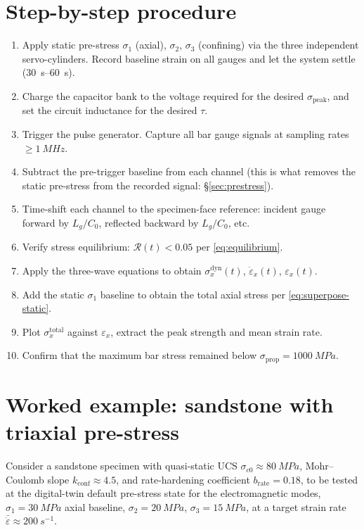 \documentclass[11pt,a4paper,openany]{book}
\providecommand{\SI}[2]{\qty{#1}{#2}}
\providecommand{\SIrange}[3]{\qtyrange{#1}{#2}{#3}}
\theoremstyle{handbook}
\newcommand{\sig}{\sigma}
\newcommand{\eps}{\varepsilon}
\newcommand{\epsdot}{\dot\eps}
\newcommand{\Cz}{C_0}
\newcommand{\sigprop}{\sig_{\text{prop}}}
\newcommand{\sigpeak}{\sig_{\text{peak}}}
\begin{document}
\section{Step-by-step procedure}

\begin{stepbox}
\begin{enumerate}[leftmargin=*,itemsep=3pt]
  \item Apply static pre-stress $\sig_1$ (axial), $\sig_2$, $\sig_3$
        (confining) via the three independent servo-cylinders. Record
        baseline strain on all gauges and let the system settle
        (\SIrange{30}{60}{s}).
  \item Charge the capacitor bank to the voltage required for the desired
        $\sigpeak$, and set the circuit inductance for the desired $\tau$.
  \item Trigger the pulse generator. Capture all bar gauge signals at
        sampling rates $\ge\SI{1}{MHz}$.
  \item Subtract the pre-trigger baseline from each channel (this is what
        removes the static pre-stress from the recorded signal:
        \S\ref{sec:prestress}).
  \item Time-shift each channel to the specimen-face reference: incident
        gauge forward by $L_g/\Cz$, reflected backward by $L_g/\Cz$, etc.
  \item Verify stress equilibrium: $\mathcal{R}(t)<0.05$ per
        \eqref{eq:equilibrium}.
  \item Apply the three-wave equations to obtain $\sig_x^{\text{dyn}}(t)$,
        $\epsdot_x(t)$, $\eps_x(t)$.
  \item Add the static $\sig_1$ baseline to obtain the total axial stress
        per \eqref{eq:superpose-static}.
  \item Plot $\sig_x^{\text{total}}$ against $\eps_x$, extract the peak
        strength and mean strain rate.
  \item Confirm that the maximum bar stress remained below
        $\sigprop=\SI{1000}{MPa}$.
\end{enumerate}
\end{stepbox}

\section{Worked example: sandstone with triaxial pre-stress}

Consider a sandstone specimen with quasi-static UCS $\sig_{c0}\approx
\SI{80}{MPa}$, Mohr--Coulomb slope $k_{\text{conf}}\approx 4.5$, and
rate-hardening coefficient $b_{\text{rate}}=0.18$, to be tested at the
digital-twin default pre-stress state for the electromagnetic modes,
$\sig_1=\SI{30}{MPa}$ axial baseline, $\sig_2=\SI{20}{MPa}$,
$\sig_3=\SI{15}{MPa}$, at a target strain rate
$\bar\epsdot\approx\SI{200}{s^{-1}}$.
\end{document}
